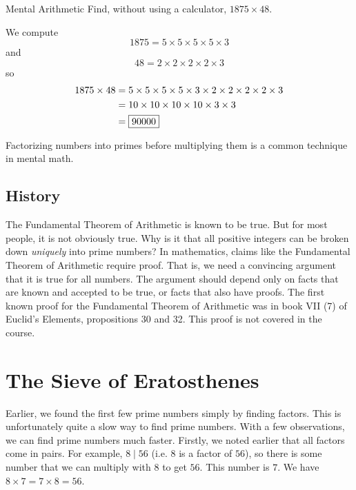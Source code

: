\documentclass[a4paper,10pt]{report}
\begin{document}
\begin{problem}{Mental Arithmetic}
 Find, without using a calculator, \(1875\times48\).

 \begin{solution}
  We compute \[
   1875 = 5 \times 5 \times 5 \times 5 \times 3
  \] and \[
   48 = 2 \times 2 \times 2 \times 2 \times 3
  \] so \begin{align*}
   1875 \times 48
   &= 5 \times 5 \times 5 \times 5 \times 3 \times 2 \times 2 \times 2 \times 2
   \times 3 \\
   &= 10 \times 10 \times 10 \times 10 \times 3 \times 3 \\
   &= \Ans{90000}
  \end{align*}

  Factorizing numbers into primes before multiplying them is a common technique
  in mental math.
 \end{solution}
\end{problem}

\subsection{History}

The Fundamental Theorem of Arithmetic is known to be true. But for most people,
it is not obviously true. Why is it that all positive integers can be broken
down \emph{uniquely} into prime numbers? In mathematics, claims like the
Fundamental Theorem of Arithmetic require proof. That is, we need a convincing
argument that it is true for all numbers. The argument should depend only on
facts that are known and accepted to be true, or facts that also have proofs.
The first known proof for the Fundamental Theorem of Arithmetic was in book VII
(7) of Euclid's Elements, propositions 30 and 32. This proof is not covered in
the course.

\section{The Sieve of Eratosthenes}

Earlier, we found the first few prime numbers simply by finding factors. This
is unfortunately quite a slow way to find prime numbers. With a few
observations, we can find prime numbers much faster. Firstly, we noted earlier
that all factors come in pairs. For example, \(8 \mid 56\) (i.e. \(8\) is a
factor of \(56\)), so there is some number that we can multiply with \(8\) to
get \(56\). This number is \(7\). We have \(8 \times 7 = 7 \times 8 = 56\).
\end{document}
